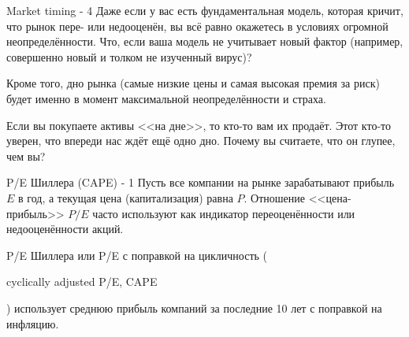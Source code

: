 \documentclass{beamer}
\newcommand{\en}[1]{\begin{otherlanguage}{english}#1\end{otherlanguage}}
\begin{document}
\begin{frame}{Market timing - 4}
\justify
Даже если у вас есть фундаментальная модель, которая кричит, что рынок пере- 
или недооценён, вы всё равно окажетесь в условиях огромной неопределённости.
Что, если ваша модель не учитывает новый фактор (например, совершенно новый и
толком не изученный вирус)?

\justify
Кроме того, дно рынка (самые низкие цены и самая высокая премия за риск) будет 
именно в момент максимальной неопределённости и страха.

\justify
Если вы покупаете активы <<на дне>>, то кто-то вам их продаёт. Этот кто-то 
уверен, что впереди нас ждёт ещё одно дно. Почему вы считаете, что он глупее,
чем вы?
\end{frame}



\begin{frame}{P/E Шиллера (CAPE) - 1}
\justify
Пусть все компании на рынке зарабатывают прибыль $E$ в год, а текущая цена 
(капитализация) равна $P$. Отношение <<цена-прибыль>> $P/E$ часто используют 
как индикатор переоценённости или недооценённости акций.

\justify
P/E Шиллера или P/E с поправкой на цикличность (\en{cyclically adjusted P/E, 
CAPE}) использует среднюю прибыль компаний за последние 10 лет с поправкой
на инфляцию.
\end{frame}



\newcommand{\dotWithNumber}[5] {
        \node[
            circle,
            fill,
            inner sep = 2pt,
            color = #3
        ]
        at (axis cs: #1, #2) {};
        
        \node[
            anchor=#5
        ]
        at (axis cs: #1, #2)
        {#4};
}
\end{document}
